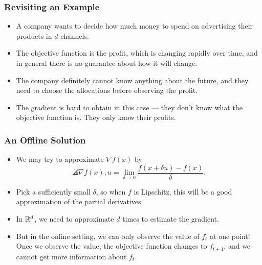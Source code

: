 \documentclass{beamer}
\begin{document}
\begin{frame}
    \frametitle{Revisiting an Example}
    \begin{itemize}
        \item A company wants to decide how much money to spend on advertising their products in $d$ channels.
        \item The objective function is the profit, which is changing rapidly over time, and in general there is no guarantee about how it will change.
        \item The company definitely cannot know anything about the future, and they need to choose the allocations before observing the profit.
        \item The gradient is hard to obtain in this case --- they don't know what the objective function is. They only know their profits.
    \end{itemize}
\end{frame}

\begin{frame}
    \frametitle{An Offline Solution}
    \begin{itemize}
        \item We may try to approximate $\nabla f(x)$ by
        \[
            \angles{\nabla f(x), u} = \lim_{\delta \to 0} \frac{f(x + \delta u) - f(x)}{\delta}.
        \]
        \item Pick a sufficiently small $\delta$, so when $f$ is Lipschitz, this will be a good approximation of the partial derivatives.
        \item In $\mathbb{R}^d$, we need to approximate $d$ times to estimate the gradient.
        \item But in the online setting, we can only observe the value of $f_t$ at one point! Once we observe the value, the objective function changes to $f_{t+1}$, and we cannot get more information about $f_t$.
    \end{itemize}
\end{frame}
\end{document}
